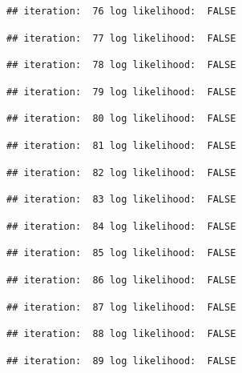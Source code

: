\documentclass[
]{article}
\begin{document}
\begin{lstlisting}
## iteration:  76 log likelihood:  FALSE
\end{lstlisting}

\begin{lstlisting}
## iteration:  77 log likelihood:  FALSE
\end{lstlisting}

\begin{lstlisting}
## iteration:  78 log likelihood:  FALSE
\end{lstlisting}

\begin{lstlisting}
## iteration:  79 log likelihood:  FALSE
\end{lstlisting}

\begin{lstlisting}
## iteration:  80 log likelihood:  FALSE
\end{lstlisting}

\begin{lstlisting}
## iteration:  81 log likelihood:  FALSE
\end{lstlisting}

\begin{lstlisting}
## iteration:  82 log likelihood:  FALSE
\end{lstlisting}

\begin{lstlisting}
## iteration:  83 log likelihood:  FALSE
\end{lstlisting}

\begin{lstlisting}
## iteration:  84 log likelihood:  FALSE
\end{lstlisting}

\begin{lstlisting}
## iteration:  85 log likelihood:  FALSE
\end{lstlisting}

\begin{lstlisting}
## iteration:  86 log likelihood:  FALSE
\end{lstlisting}

\begin{lstlisting}
## iteration:  87 log likelihood:  FALSE
\end{lstlisting}

\begin{lstlisting}
## iteration:  88 log likelihood:  FALSE
\end{lstlisting}

\begin{lstlisting}
## iteration:  89 log likelihood:  FALSE
\end{lstlisting}
\end{document}
